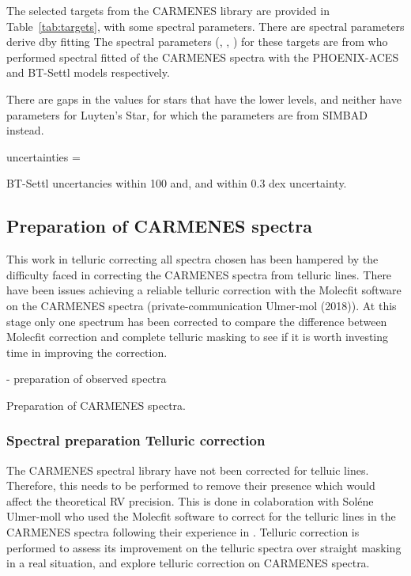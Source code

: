The selected targets from the {CARMENES} library are provided in Table~\ref{tab:targets}, with some spectral parameters.
There are spectral parameters derive dby fitting
The spectral parameters (\Teff{}, \Logg{}, \feh{}) for these targets are from \citep{passegger_carmenes_2018, rajpurohit_exploring_2018} who performed spectral fitted of the {CARMENES} spectra with the PHOENIX-ACES and BT-Settl models respectively.

There are gaps in the \citet{passegger_carmenes_2018} values for stars that have the lower \snr{} levels, and neither have parameters for Luyten's Star, for which the parameters are from SIMBAD instead.

\citep{passegger_carmenes_2018} uncertainties = 

BT-Settl uncertancies \Teff{} within 100 \K{} and, \Logg{} and \feh{} within 0.3 dex uncertainty.

\begin{landscape}
    
\end{landscape}


\subsection{Preparation of {CARMENES} spectra}
\label{subsec:prepatation_on_carmenes}
This work in telluric correcting all spectra chosen has been hampered by the difficulty faced in correcting the CARMENES spectra from telluric lines.
There have been issues achieving a reliable telluric correction with the Molecfit software on the {CARMENES} spectra (private-communication Ulmer-mol (2018)).
At this stage only one spectrum has been corrected to compare the difference between Molecfit correction and complete telluric masking to see if it is worth investing time in improving the correction.


- preparation of observed spectra

Preparation of {CARMENES} spectra.



\subsubsection{Spectral preparation Telluric correction}
\label{subsec:prepatation_on_carmenes}
The CARMENES spectral library have not been corrected for telluic lines.
Therefore, this needs to be performed to remove their presence which would affect the theoretical {RV} precision.
This is done in colaboration with Sol\'ene Ulmer-moll who used the Molecfit software \citep{smette_molecfit_2015} to correct for the telluric lines in the CARMENES spectra following their experience in \citet{ulmer-moll_telluric_2018}. 
Telluric correction is performed to assess its improvement on the telluric spectra over straight masking in a real situation, and explore telluric correction on CARMENES spectra.
 
